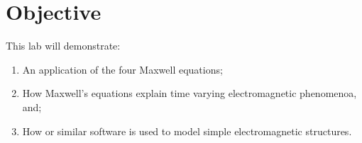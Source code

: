 \section{Objective}\label{sec:objective}
This lab will demonstrate: 
\begin{enumerate}
	\item An application of the four Maxwell equations;
	\item How Maxwell's equations explain time varying electromagnetic phenomenoa, and;
	\item How \mefisto{} or similar software is used to model simple electromagnetic structures.
\end{enumerate}

